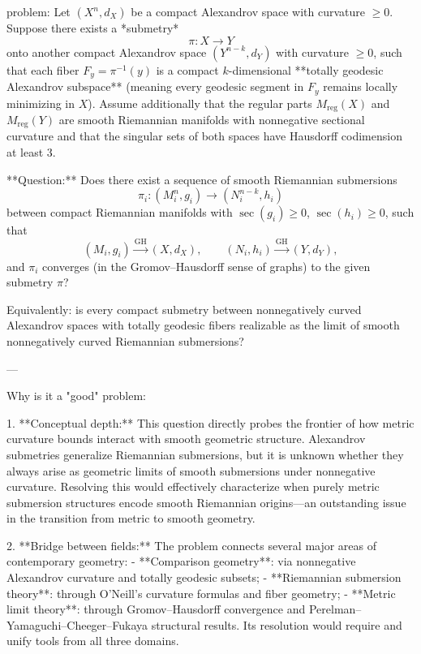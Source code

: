 problem:  
Let \((X^n,d_X)\) be a compact Alexandrov space with curvature \(\ge 0\).  
Suppose there exists a *submetry*  
\[
\pi : X \to Y
\]
onto another compact Alexandrov space \((Y^{n-k}, d_Y)\) with curvature \(\ge 0\), such that each fiber \(F_y = \pi^{-1}(y)\) is a compact \(k\)-dimensional **totally geodesic Alexandrov subspace** (meaning every geodesic segment in \(F_y\) remains locally minimizing in \(X\)).  
Assume additionally that the regular parts \(M_{\mathrm{reg}}(X)\) and \(M_{\mathrm{reg}}(Y)\) are smooth Riemannian manifolds with nonnegative sectional curvature and that the singular sets of both spaces have Hausdorff codimension at least \(3\).  

**Question:**  
Does there exist a sequence of smooth Riemannian submersions
\[
\pi_i : (M_i^n, g_i) \longrightarrow (N_i^{n-k}, h_i)
\]
between compact Riemannian manifolds with \(\sec(g_i)\ge 0\), \(\sec(h_i)\ge 0\), such that  
\[
(M_i,g_i) \xrightarrow{\mathrm{GH}} (X,d_X), \qquad (N_i,h_i) \xrightarrow{\mathrm{GH}} (Y,d_Y),
\]
and \(\pi_i\) converges (in the Gromov–Hausdorff sense of graphs) to the given submetry \(\pi\)?  

Equivalently: is every compact submetry between nonnegatively curved Alexandrov spaces with totally geodesic fibers realizable as the limit of smooth nonnegatively curved Riemannian submersions?

---

Why is it a "good" problem:  

1. **Conceptual depth:**  
   This question directly probes the frontier of how metric curvature bounds interact with smooth geometric structure. Alexandrov submetries generalize Riemannian submersions, but it is unknown whether they always arise as geometric limits of smooth submersions under nonnegative curvature. Resolving this would effectively characterize when purely metric submersion structures encode smooth Riemannian origins—an outstanding issue in the transition from metric to smooth geometry.

2. **Bridge between fields:**  
   The problem connects several major areas of contemporary geometry:
   - **Comparison geometry**: via nonnegative Alexandrov curvature and totally geodesic subsets;  
   - **Riemannian submersion theory**: through O’Neill’s curvature formulas and fiber geometry;  
   - **Metric limit theory**: through Gromov–Hausdorff convergence and Perelman–Yamaguchi–Cheeger–Fukaya structural results.  
   Its resolution would require and unify tools from all three domains.

